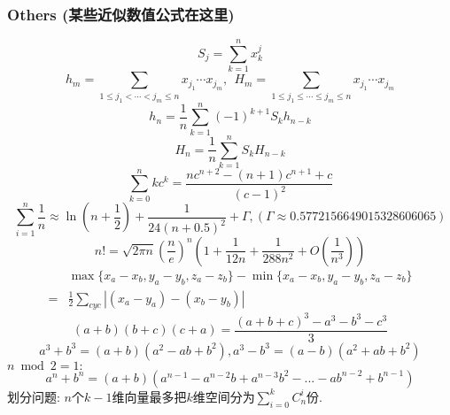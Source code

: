 \begin{small}
\subsubsection{Others (某些近似数值公式在这里)}
\[ S_j = \sum_{k=1}^nx_k^j \]
\[ h_m = \sum_{1\leq j_1 < \cdots < j_m \leq n} x_{j_1}\cdots x_{j_m},\ \ H_m = \sum_{1\leq j_1 \leq \cdots \leq j_m \leq n} x_{j_1}\cdots x_{j_m} \]
\[ h_n = \frac{1}{n}\sum_{k=1}^n(-1)^{k+1}S_kh_{n-k} \]
\[ H_n = \frac{1}{n}\sum_{k=1}^nS_kH_{n-k} \]
\[ \sum_{k=0}^nkc^k = \frac{nc^{n+2}-(n+1)c^{n+1}+c}{(c-1)^2} \]
\[ \sum_{i=1}^n\frac 1n\approx\ln(n + \frac12) + \frac{1}{24(n+0.5)^2}+\Gamma,(\Gamma\approx0.5772156649015328606065)\]
\[ n! = \sqrt{2\pi n}(\frac{n}{e})^n(1+\frac{1}{12n}+\frac{1}{288n^2}+O(\frac{1}{n^3})) \]
\[ \begin{aligned}
 &\max{\{x_a-x_b, y_a-y_b, z_a-z_b\}} - \min{\{x_a-x_b, y_a-y_b, z_a-z_b\}} \\
=& \frac{1}{2}\sum_{cyc}\left| (x_a-y_a)-(x_b-y_b) \right|
\end{aligned} \]
\[ (a+b)(b+c)(c+a) = \frac{(a+b+c)^3 - a^3 - b^3 - c^3}{3} \]
\[ a^3+b^3=(a+b)(a^2-ab+b^2),a^3-b^3=(a-b)(a^2+ab+b^2) \]
$n\bmod 2=1:$
\[ a^n+b^n=(a+b)(a^{n-1}-a^{n-2}b+a^{n-3}b^2-...-ab^{n-2}+b^{n-1})\]
划分问题: $n$个$k-1$维向量最多把$k$维空间分为$\sum_{i=0}^{k}C_n^i$份.
\end{small}
